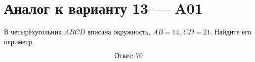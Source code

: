 


\section*{Аналог к варианту 13 — A01}
В четырёхугольник \(ABCD\) вписана окружность, \(AB=14\), \(CD=21\). Найдите его периметр.
\begin{center}\figTangentialPerimeter\end{center}
\[\boxed{\text{Ответ: }70}\]

